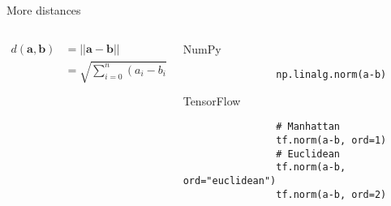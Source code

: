 \documentclass[handout]{beamer}
\begin{document}
\begin{frame}[fragile]{More distances}
    \begin{columns}
        \begin{column}{0.5\textwidth}
    \Large
    \begin{align*}
        d(\boldsymbol{a}, \boldsymbol{b}) &= ||\boldsymbol{a} - \boldsymbol{b}||\\
                                          &= \sqrt{\sum_{i=0}^n (a_{i} - b_{i})^2}
    \end{align*}
        \end{column}
        \begin{column}{0.5\textwidth}
            \begin{alertblock}{NumPy}
                \begin{lstlisting}
                np.linalg.norm(a-b)
                \end{lstlisting}
            \end{alertblock}
            \begin{alertblock}{TensorFlow}
                \begin{lstlisting}
                # Manhattan
                tf.norm(a-b, ord=1)
                # Euclidean
                tf.norm(a-b, ord="euclidean")
                tf.norm(a-b, ord=2)
                \end{lstlisting}
            \end{alertblock}
        \end{column}
    \end{columns}
\end{frame}
\end{document}
